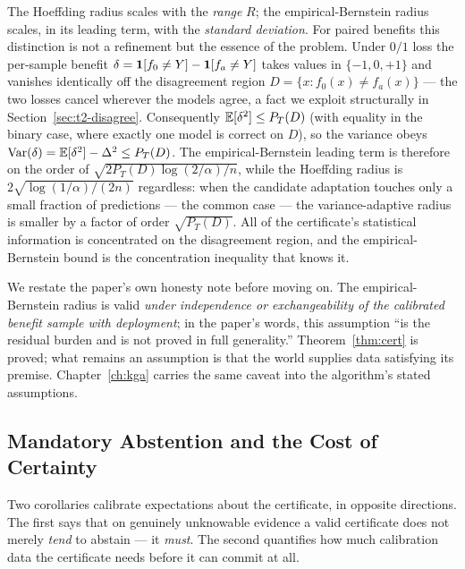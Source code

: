 \begin{remark}
\label{sec:t2-rem-variance}
The Hoeffding radius scales with the \emph{range} $R$; the empirical-Bernstein radius
scales, in its leading term, with the \emph{standard deviation}. For paired benefits
this distinction is not a refinement but the essence of the problem. Under $0/1$ loss
the per-sample benefit $\delta=\mathbf{1}[f_0\neq Y]-\mathbf{1}[f_a\neq Y]$ takes values in
$\{-1,0,+1\}$ and vanishes identically off the disagreement region
$D=\{x:f_0(x)\neq f_a(x)\}$ --- the two losses cancel wherever the models agree, a fact
we exploit structurally in Section~\ref{sec:t2-disagree}. Consequently
$\mathbb{E}[\delta^2]\le P_T(D)$ (with equality in the binary case, where exactly one model is
correct on $D$), so the variance obeys $\mathrm{Var}(\delta)=\mathbb{E}[\delta^2]-\Delta^2\le P_T(D)$.
The empirical-Bernstein leading term is therefore on the order of
$\sqrt{2P_T(D)\log(2/\alpha)/n}$, while the Hoeffding radius is
$2\sqrt{\log(1/\alpha)/(2n)}$ regardless: when the candidate adaptation touches only a
small fraction of predictions --- the common case --- the variance-adaptive radius is
smaller by a factor of order $\sqrt{P_T(D)}$. All of the certificate's statistical
information is concentrated on the disagreement region, and the empirical-Bernstein
bound is the concentration inequality that knows it.
\end{remark}

We restate the paper's own honesty note before moving on. The empirical-Bernstein
radius is valid \emph{under independence or exchangeability of the calibrated benefit
sample with deployment}; in the paper's words, this assumption ``is the residual burden
and is not proved in full generality.'' Theorem~\ref{thm:cert} is proved; what remains
an assumption is that the world supplies data satisfying its premise. Chapter~\ref{ch:kga}
carries the same caveat into the algorithm's stated assumptions.

\subsection{Mandatory Abstention and the Cost of Certainty}
\label{sec:t2-forced}

Two corollaries calibrate expectations about the certificate, in opposite directions.
The first says that on genuinely unknowable evidence a valid certificate does not
merely \emph{tend} to abstain --- it \emph{must}. The second quantifies how much
calibration data the certificate needs before it can commit at all.

